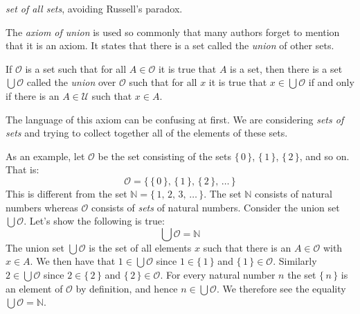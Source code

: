             \textit{set of all sets}, avoiding Russell's paradox.
            \par\hfill\par
            The \textit{axiom of union} is used so commonly that many authors
            forget to mention that it is an axiom. It states that there is a
            set called the \textit{union} of other sets.
            \begin{axiom}
                If $\mathcal{O}$ is a set such that for all $A\in\mathcal{O}$ it
                is true that $A$ is a set, then there is a set
                $\bigcup\mathcal{O}$ called the \textit{union} over
                $\mathcal{O}$ such that for all $x$ it is true that
                $x\in\bigcup\mathcal{O}$ if and only if there is an
                $A\in\mathcal{U}$ such that $x\in{A}$.
            \end{axiom}
            The language of this axiom can be confusing at first. We are
            considering \textit{sets of sets} and trying to collect together
            all of the elements of these sets.
            \begin{example}
                As an example, let $\mathcal{O}$ be the set consisting of
                the sets $\{\,0\,\}$, $\{\,1\,\}$, $\{\,2\,\}$, and so on.
                That is:
                \begin{equation}
                    \mathcal{O}=
                    \big\{\,\{\,0\,\},\,\{\,1\,\},\,\{\,2\,\},\,\dots\,\big\}
                \end{equation}
                This is different from the set
                $\mathbb{N}=\{\,1,\,2,\,3,\,\dots\,\}$. The set $\mathbb{N}$
                consists of natural numbers whereas $\mathcal{O}$ consists of
                \textit{sets} of natural numbers. Consider the union set
                $\bigcup\mathcal{O}$. Let's show the following is true:
                \begin{equation}
                    \bigcup\mathcal{O}=\mathbb{N}
                \end{equation}
                The union set $\bigcup\mathcal{O}$ is the set of all elements
                $x$ such that there is an $A\in\mathcal{O}$ with $x\in{A}$.
                We then have that $1\in\bigcup\mathcal{O}$ since
                $1\in\{\,1\,\}$ and $\{\,1\,\}\in\mathcal{O}$. Similarly
                $2\in\bigcup\mathcal{O}$ since $2\in\{\,2\,\}$ and
                $\{\,2\,\}\in\mathcal{O}$. For every natural number
                $n$ the set $\{\,n\,\}$ is an element of $\mathcal{O}$ by
                definition, and hence $n\in\bigcup\mathcal{O}$. We therefore
                see the equality $\bigcup\mathcal{O}=\mathbb{N}$.
            \end{example}
